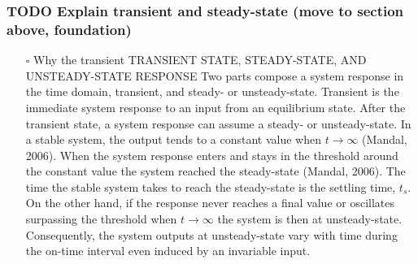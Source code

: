 \documentclass{article}
\begin{document}
\subsubsection{TODO Explain transient and steady-state (move to section above, foundation)}
\label{sec:orgfa98ff3}
\begin{itemize}
\item[{$\square$}] Why the transient
TRANSIENT STATE, STEADY-STATE, AND UNSTEADY-STATE RESPONSE
Two parts compose a system response in the time domain, transient, and steady- or unsteady-state.
Transient is the immediate system response to an input from an equilibrium state.
After the transient state, a system response can assume a steady- or unsteady-state.
In a stable system, the output tends to a constant value when \(t→∞\) (Mandal, 2006).
When the system response enters and stays in the threshold around the constant value the system reached the steady-state (Mandal, 2006).
The time the stable system takes to reach the steady-state is the settling time, \(t_s\).
On the other hand, if the response never reaches a final value or oscillates surpassing the threshold when \(t→∞\) the system is then at unsteady-state.
Consequently, the system outputs at unsteady-state vary with time during the on-time interval even induced by an invariable input.
\end{itemize}
\end{document}
